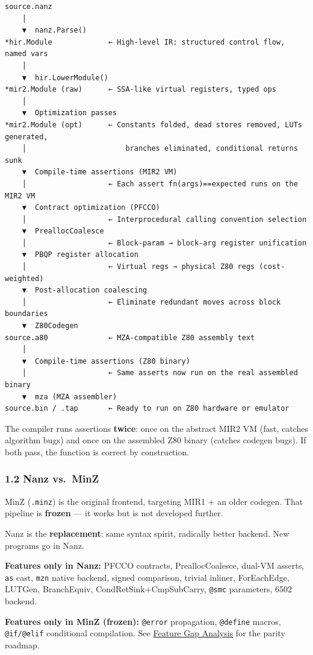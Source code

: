 \documentclass[
  11pt,
]{article}
\begin{document}
\begin{verbatim}
source.nanz
    │
    ▼  nanz.Parse()
*hir.Module             ← High-level IR: structured control flow, named vars
    │
    ▼  hir.LowerModule()
*mir2.Module (raw)      ← SSA-like virtual registers, typed ops
    │
    ▼  Optimization passes
*mir2.Module (opt)      ← Constants folded, dead stores removed, LUTs generated,
    │                       branches eliminated, conditional returns sunk
    ▼  Compile-time assertions (MIR2 VM)
    │                   ← Each assert fn(args)==expected runs on the MIR2 VM
    ▼  Contract optimization (PFCCO)
    │                   ← Interprocedural calling convention selection
    ▼  PreallocCoalesce
    │                   ← Block-param → block-arg register unification
    ▼  PBQP register allocation
    │                   ← Virtual regs → physical Z80 regs (cost-weighted)
    ▼  Post-allocation coalescing
    │                   ← Eliminate redundant moves across block boundaries
    ▼  Z80Codegen
source.a80              ← MZA-compatible Z80 assembly text
    │
    ▼  Compile-time assertions (Z80 binary)
    │                   ← Same asserts now run on the real assembled binary
    ▼  mza (MZA assembler)
source.bin / .tap       ← Ready to run on Z80 hardware or emulator
\end{verbatim}

The compiler runs assertions \textbf{twice}: once on the abstract MIR2
VM (fast, catches algorithm bugs) and once on the assembled Z80 binary
(catches codegen bugs). If both pass, the function is correct by
construction.

\hypertarget{nanz-vs.-minz}{%
\subsubsection{1.2 Nanz vs.~MinZ}\label{nanz-vs.-minz}}

MinZ (\texttt{.minz}) is the original frontend, targeting MIR1 + an
older codegen. That pipeline is \textbf{frozen} --- it works but is not
developed further.

Nanz is the \textbf{replacement}: same syntax spirit, radically better
backend. New programs go in Nanz.

\textbf{Features only in Nanz:} PFCCO contracts, PreallocCoalesce,
dual-VM asserts, \texttt{as} cast, \texttt{mzn} native backend, signed
comparison, trivial inliner, ForEachEdge, LUTGen, BranchEquiv,
CondRetSink+CmpSubCarry, \texttt{@smc} parameters, 6502 backend.

\textbf{Features only in MinZ (frozen):} \texttt{@error} propagation,
\texttt{@define} macros, \texttt{@if/@elif} conditional compilation. See
\href{MinZ_vs_Nanz_Feature_Gap.md}{Feature Gap Analysis} for the parity
roadmap.
\end{document}
